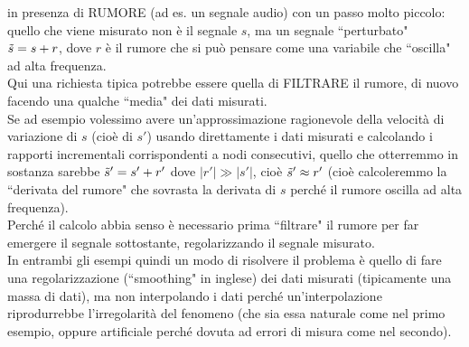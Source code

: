 \documentclass[12pt,a4paper]{article}
\begin{document}
in presenza di RUMORE (ad es. un segnale audio) con un passo molto piccolo: quello che viene misurato non è il segnale $s$, ma un segnale ``perturbato" $\Tilde{s} = s+r$, dove $r$ è il rumore che si può pensare come una variabile che ``oscilla" ad alta frequenza.\\
Qui una richiesta tipica potrebbe essere quella di FILTRARE il rumore, di nuovo facendo una qualche ``media" dei dati misurati.\\
Se ad esempio volessimo avere un'approssimazione ragionevole della velocità di variazione di $s$ (cioè
di $s'$) usando direttamente i dati misurati e calcolando i rapporti incrementali corrispondenti a nodi consecutivi, quello che otterremmo in sostanza sarebbe $\Tilde{s}' = s' + r'$ dove $|r'| \gg |s'|$, cioè $\Tilde{s}' \approx r'$ (cioè calcoleremmo la ``derivata del rumore" che sovrasta la derivata di $s$ perché il rumore oscilla ad alta frequenza). \\
Perché il calcolo abbia senso è necessario prima ``filtrare" il rumore per far emergere il segnale sottostante, regolarizzando il segnale misurato. \\
In entrambi gli esempi quindi
un modo di risolvere il problema è quello di fare una regolarizzazione (``smoothing" in inglese) dei dati misurati (tipicamente una massa di dati), ma non interpolando i dati perché un'interpolazione riprodurrebbe l'irregolarità del fenomeno (che sia essa naturale come nel primo esempio, oppure artificiale perché dovuta ad errori di misura come nel secondo). 
\end{document}
